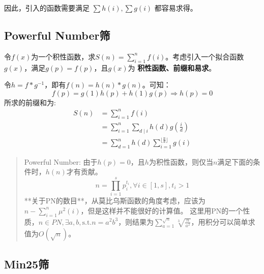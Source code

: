因此，引入的函数需要满足 $\sum{h(i)},\sum{g(i)}$ 都容易求得。

\subsection{Powerful Number筛}
令$f(x)$为一个积性函数，求$S(n)=\sum_{i=1}^{n}f(i)$。考虑引入一个拟合函数$g(x)$，满足$g(p)=f(p)$，且$g(x)$为 \textbf{积性函数、前缀和易求}。

令$h=f*g^{-1}$，即有$f(n)=h(n)*g(n)$。可知：
\[ f(p)=g(1)h(p)+h(1)g(p) \Rightarrow h(p)=0 \]
所求的前缀和为:
\[
  \begin{aligned}
    S(n) 
    &= \sum_{i=1}^{n}f(i) \\
    &= \sum_{i=1}^{n}\sum_{d\mid i}h(d)g(\frac{i}{d}) \\
    &= \sum_{d=1}^{n}h(d)\sum_{i=1}^{\lfloor\frac{n}{d}\rfloor}g(i)
  \end{aligned}
\]

\begin{quotation}
Powerful Number: 由于$h(p)=0$，且$h$为积性函数，则仅当$n$满足下面的条件时，$h(n)$才有贡献。
\[ n=\prod_{i=1}^{s} p_i^{t_i},\forall i \in [1, s],t_i>1 \]
**关于PN的数目**，从莫比乌斯函数的角度考虑，应该为$n-\sum_{i=1}^{n}\mu^2(i)$，但是这样并不能很好的计算值。
这里用PN的一个性质，$n\in PN,\exists a,b, \mathrm{s.t. } n=a^2b^3$，则结果为$\sum_{a=1}^{\sqrt n}\sqrt[3]{\frac{n}{a^2}}$，用积分可以简单求值为$O(\sqrt n)$。
\end{quotation}  
  
\subsection{Min25筛}